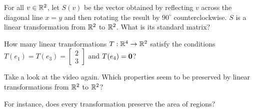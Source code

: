 



\edXsolution{ 

}


\endedxproblem



For all $v\in \mathbb R^2$, let $S(v)$ be the vector obtained by reflecting $v$ across the diagonal line $x=y$ 
and 
then rotating the result by $90^\circ$ counterclockwise.  
$S$ is a linear transformation from $\mathbb R^2$ to $\mathbb R^2$.  What is its standard matrix?
 




\edXsolution{ 

}


\endedxproblem




How many linear transformations $T:\mathbb R^4 \rightarrow \mathbb R^2$ satisfy 
the conditions
$T(e_1) = T(e_3) =  \left[\begin{array}{c} 2 \\ 3   \end{array} \right]$
and $T(e_4) = \mathbf{0}$?  


\edXsolution{ 

}


\endedxproblem



\endedxvertical











Take a look at the video again.  Which properties seem to be preserved by linear transformations
from $\mathbb R^2$ to $\mathbb R^2$?  


For instance, does every transformation preserve the area of regions? 



